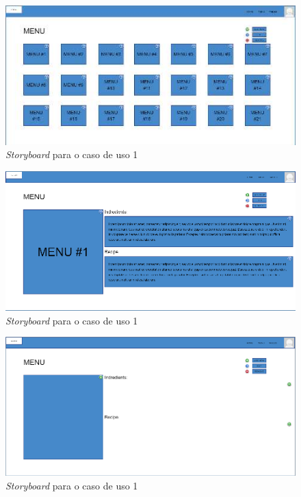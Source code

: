 \FloatBarrier
\begin{figure}[!hbt]
    \centering
    \includegraphics[width=14cm]{Resources/Previous/image-103.jpg}
    \caption{\textit{Storyboard} para o caso de uso 1}
    
\end{figure}
\FloatBarrier
\begin{figure}[!hbt]
    \centering
    \includegraphics[width=14cm]{Resources/Previous/image-104.png}
    \caption{\textit{Storyboard} para o caso de uso 1}
    
\end{figure}
\FloatBarrier
\begin{figure}[!hbt]
    \centering
    \includegraphics[width=14cm]{Resources/Previous/image-105.png}
    \caption{\textit{Storyboard} para o caso de uso 1}
    
\end{figure}
\FloatBarrier

